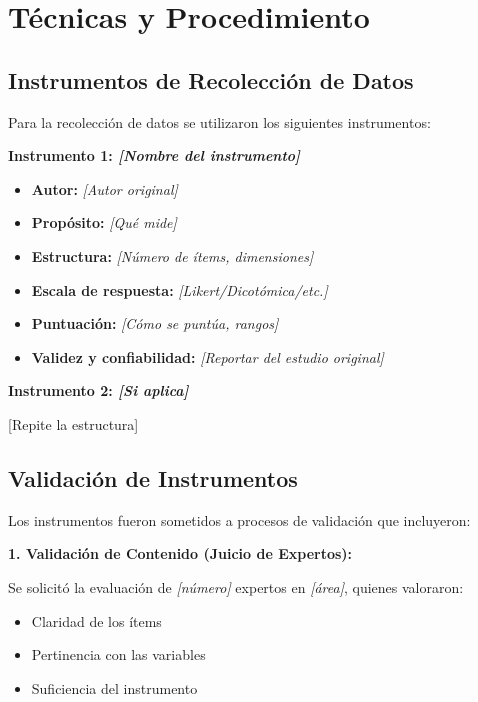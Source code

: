 \section{Técnicas y Procedimiento}
\label{sec:tecnicas_procedimiento}

\subsection{Instrumentos de Recolección de Datos}
\label{subsec:instrumentos}

Para la recolección de datos se utilizaron los siguientes instrumentos:

\textbf{Instrumento 1: \textit{[Nombre del instrumento]}}

\begin{itemize}
    \item \textbf{Autor:} \textit{[Autor original]} \cite{referencia}
    \item \textbf{Propósito:} \textit{[Qué mide]}
    \item \textbf{Estructura:} \textit{[Número de ítems, dimensiones]}
    \item \textbf{Escala de respuesta:} \textit{[Likert/Dicotómica/etc.]}
    \item \textbf{Puntuación:} \textit{[Cómo se puntúa, rangos]}
    \item \textbf{Validez y confiabilidad:} \textit{[Reportar del estudio original]}
\end{itemize}

\textbf{Instrumento 2: \textit{[Si aplica]}}

[Repite la estructura]

\subsection{Validación de Instrumentos}
\label{subsec:validacion_instrumentos}


Los instrumentos fueron sometidos a procesos de validación que incluyeron:

\textbf{1. Validación de Contenido (Juicio de Expertos):}

Se solicitó la evaluación de \textit{[número]} expertos en \textit{[área]}, quienes valoraron:
\begin{itemize}
    \item Claridad de los ítems
    \item Pertinencia con las variables
    \item Suficiencia del instrumento
\end{itemize}

